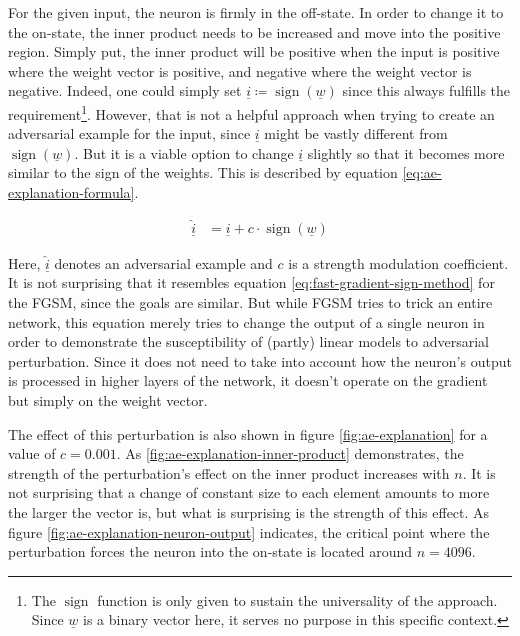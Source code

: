 \documentclass[11pt, a4paper]{article}
\newcommand\braces[1]{\left(#1\right)}
\renewcommand{\vec}[1]{\underline{#1}}
\DeclareMathOperator{\sign}{sign}
\begin{document}

For the given input, the neuron is firmly in the off-state. In order to change it to the on-state, the inner product needs to be increased and move into the positive region. Simply put, the inner product will be positive when the input is positive where the weight vector is positive, and negative where the weight vector is negative. Indeed, one could simply set $\vec{i} \coloneqq \sign \braces{\vec{w}}$ since this always fulfills the requirement\footnote{The $\sign$ function is only given to sustain the universality of the approach. Since $\vec{w}$ is a binary vector here, it serves no purpose in this specific context.}. However, that is not a helpful approach when trying to create an adversarial example for the input, since $\vec{i}$ might be vastly different from $\sign \braces{\vec{w}}$. But it is a viable option to change $\vec{i}$ slightly so that it becomes more similar to the sign of the weights. This is described by equation \eqref{eq:ae-explanation-formula}.

\begin{align}
	\vec{\hat i}&= \vec{i} + c \cdot \sign \braces{\vec{w}} \label{eq:ae-explanation-formula}
\end{align}

Here, $\vec{\hat i}$ denotes an adversarial example and $c$ is a strength modulation coefficient. It is not surprising that it resembles equation \eqref{eq:fast-gradient-sign-method} for the FGSM, since the goals are similar. But while FGSM tries to trick an entire network, this equation merely tries to change the output of a single neuron in order to demonstrate the susceptibility of (partly) linear models to adversarial perturbation. Since it does not need to take into account how the neuron's output is processed in higher layers of the network, it doesn't operate on the gradient but simply on the weight vector.

The effect of this perturbation is also shown in figure \ref{fig:ae-explanation} for a value of $c = 0.001$. As \ref{fig:ae-explanation-inner-product} demonstrates, the strength of the perturbation's effect on the inner product increases with $n$. It is not surprising that a change of constant size to each element amounts to more the larger the vector is, but what is surprising is the strength of this effect. As figure \ref{fig:ae-explanation-neuron-output} indicates, the critical point where the perturbation forces the neuron into the on-state is located around $n = 4096$.
\end{document}
